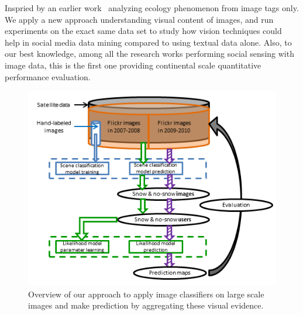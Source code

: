 Inspried by an earlier work~\cite{ecology2012www} 
analyzing ecology phenomenon from image tags only. We apply a new approach 
understanding visual content of images, and run experiments on the exact same 
data set to study how vision techniques could help in social media data mining 
compared to using textual data alone. Also, to our best knowledge, among all the 
research works performing social sensing with image data, this is the first one 
providing continental scale quantitative performance evaluation.


\begin{figure}
\centering
\includegraphics[scale=1]{figure/flowchartWevaluation.png}
\caption{Overview of our approach to apply image classifiers on large scale images and make prediction by aggregating these visual evidence.}
\label{fig:overview}
\end{figure}


